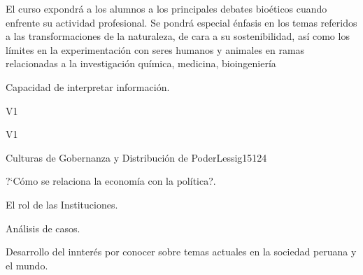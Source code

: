 \begin{syllabus}


\begin{justification}
El curso expondrá a los alumnos a los principales debates bioéticos cuando enfrente su actividad profesional. Se pondrá especial énfasis en los temas referidos a las transformaciones de la naturaleza, de cara a su sostenibilidad, así como los límites en la experimentación con seres humanos y animales en ramas relacionadas a la investigación química, medicina, bioingeniería
\end{justification}

\begin{goals}
\item Capacidad de interpretar información.
\end{goals}

\begin{outcomes}{V1}
    \item {}
    \item {}
    \item {}
    
\end{outcomes}

\begin{competences}{V1}
    \item {}
    \item {}
    \item {}
    \item {}
\end{competences}

\begin{unit}{Culturas de Gobernanza y Distribución de Poder}{}{Lessig15}{12}{4}
   \begin{topics}
      \item ?`Cómo se relaciona la economía con la política?.
      \item El rol de las Instituciones.
      \item Análisis de casos.
   \end{topics}
   \begin{learningoutcomes}
      \item Desarrollo del innterés por conocer sobre temas actuales en la sociedad peruana y el mundo.
   \end{learningoutcomes}
\end{unit}

\begin{coursebibliography}
\end{coursebibliography}

\end{syllabus}
